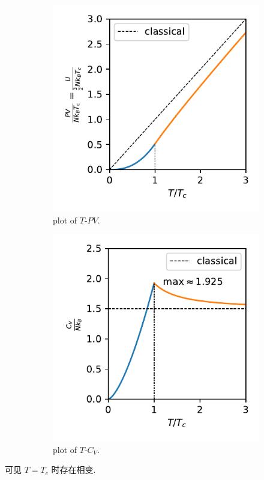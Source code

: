 \begin{itemize}
	\begin{figure}[H]
		\centering
		\begin{subfigure}{0.4\linewidth}
			\centering
			\includegraphics[scale=0.8]{figures/plot of T-PV.pdf}
			\caption{plot of $T$-$P V$.}
		\end{subfigure}
		\begin{subfigure}{0.4\linewidth}
			\centering
			\includegraphics[scale=0.8]{figures/plot of T-C_V.pdf}
			\caption{plot of $T$-$C_V$.}
		\end{subfigure}
		\caption{}
	\end{figure}
	
	可见 $T = T_c$ 时存在相变.
\end{itemize}


